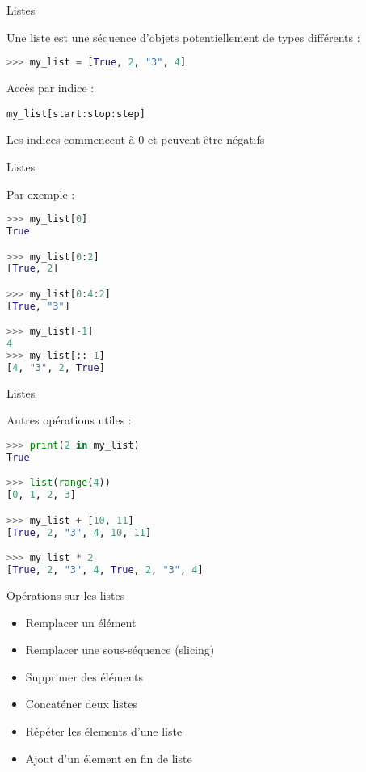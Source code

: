 \begin{frame}[fragile]{Listes}

  Une liste est une séquence d'objets potentiellement de types différents :
\begin{lstlisting}[language=Python, morekeywords={True, false}, numbers=none]
>>> my_list = [True, 2, "3", 4]
\end{lstlisting}
  
  Accès par indice :
  \begin{center}
  \texttt{my\_list[start:stop:step]}
  \end{center}

  Les indices commencent à 0 et peuvent être négatifs
\end{frame}

\begin{frame}[fragile]{Listes}

  Par exemple :
\begin{lstlisting}[language=Python, morekeywords={True, false}, numbers=none]
>>> my_list[0]
True

>>> my_list[0:2]
[True, 2]

>>> my_list[0:4:2]
[True, "3"]

>>> my_list[-1]
4
>>> my_list[::-1]
[4, "3", 2, True]

\end{lstlisting}

\end{frame}


\begin{frame}[fragile]{Listes}

  Autres opérations utiles :
\begin{lstlisting}[language=Python, morekeywords={True, false}, numbers=none]
>>> print(2 in my_list)
True

>>> list(range(4))
[0, 1, 2, 3]

>>> my_list + [10, 11]
[True, 2, "3", 4, 10, 11]

>>> my_list * 2
[True, 2, "3", 4, True, 2, "3", 4]
\end{lstlisting}

\end{frame}



\begin{frame}{Opérations sur les listes}

  \begin{itemize}
    \item Remplacer un élément
    \item Remplacer une sous-séquence (slicing)
    \item Supprimer des éléments
    \item Concaténer deux listes
    \item Répéter les élements d'une liste
    \item Ajout d'un élement en fin de liste
  \end{itemize}
  
\end{frame}

